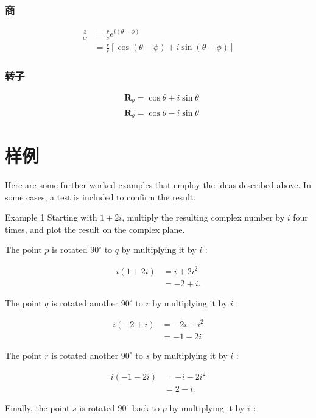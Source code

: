 \subsubsection*{商}
$$
\begin{aligned}
\frac{z}{w} & =\frac{r}{s} e^{i(\theta-\phi)} \\
& =\frac{r}{s}[\cos (\theta-\phi)+i \sin (\theta-\phi)]
\end{aligned}
$$

\subsubsection*{转子}
$$
\begin{aligned}
& \mathbf{R}_{\theta}=\cos \theta+i \sin \theta \\
& \mathbf{R}_{\theta}^{\dagger}=\cos \theta-i \sin \theta
\end{aligned}
$$

\section{样例}
Here are some further worked examples that employ the ideas described above. In some cases, a test is included to confirm the result.

Example 1 Starting with $1+2 i$, multiply the resulting complex number by $i$ four times, and plot the result on the complex plane.

The point $p$ is rotated $90^{\circ}$ to $q$ by multiplying it by $i$ :

$$
\begin{aligned}
i(1+2 i) & =i+2 i^{2} \\
& =-2+i .
\end{aligned}
$$

The point $q$ is rotated another $90^{\circ}$ to $r$ by multiplying it by $i$ :

$$
\begin{aligned}
i(-2+i) & =-2 i+i^{2} \\
& =-1-2 i
\end{aligned}
$$

The point $r$ is rotated another $90^{\circ}$ to $s$ by multiplying it by $i$ :

$$
\begin{aligned}
i(-1-2 i) & =-i-2 i^{2} \\
& =2-i .
\end{aligned}
$$

Finally, the point $s$ is rotated $90^{\circ}$ back to $p$ by multiplying it by $i$ :

